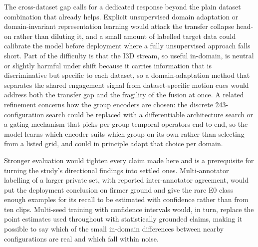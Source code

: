 \documentclass[../main.tex]{subfiles}
\begin{document}
The cross-dataset gap calls for a dedicated response beyond the plain dataset combination that already helps. Explicit unsupervised domain adaptation or domain-invariant representation learning would attack the transfer collapse head-on rather than diluting it, and a small amount of labelled target data could calibrate the model before deployment where a fully unsupervised approach falls short. Part of the difficulty is that the I3D stream, so useful in-domain, is neutral or slightly harmful under shift because it carries information that is discriminative but specific to each dataset, so a domain-adaptation method that separates the shared engagement signal from dataset-specific motion cues would address both the transfer gap and the fragility of the fusion at once. A related refinement concerns how the group encoders are chosen: the discrete 243-configuration search could be replaced with a differentiable architecture search or a gating mechanism that picks per-group temporal operators end-to-end, so the model learns which encoder suits which group on its own rather than selecting from a listed grid, and could in principle adapt that choice per domain.

Stronger evaluation would tighten every claim made here and is a prerequisite for turning the study's directional findings into settled ones. Multi-annotator labelling of a larger private set, with reported inter-annotator agreement, would put the deployment conclusion on firmer ground and give the rare E0 class enough examples for its recall to be estimated with confidence rather than from ten clips. Multi-seed training with confidence intervals would, in turn, replace the point estimates used throughout with statistically grounded claims, making it possible to say which of the small in-domain differences between nearby configurations are real and which fall within noise.
\end{document}
